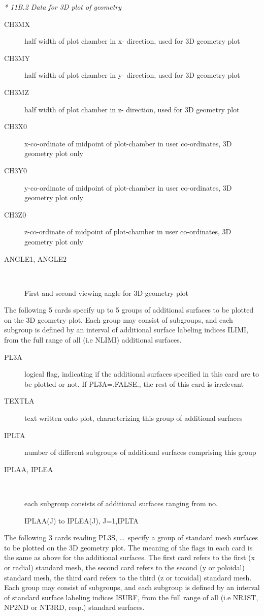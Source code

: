 \textsl{* 11B.2 Data for 3D plot of geometry}

\begin{description}
  \item[CH3MX] half width of plot chamber in x- direction, used for 3D geometry
        plot
  \item[CH3MY] half width of plot chamber in y- direction, used for 3D
        geometry plot
  \item[CH3MZ] half width of plot chamber in z- direction, used for
        3D geometry plot
  \item[CH3X0] x-co-ordinate of midpoint of plot-chamber in user
        co-ordinates, 3D geometry plot only
  \item[CH3Y0] y-co-ordinate of midpoint of
        plot-chamber in user co-ordinates, 3D geometry plot only
  \item[CH3Z0]
        z-co-ordinate of midpoint of plot-chamber in user co-ordinates, 3D geometry
        plot only
  \item[ANGLE1, ANGLE2] ~ 

        First and second viewing angle for 3D geometry plot
\end{description}

The following 5 cards specify up to 5 groups of additional surfaces to be
plotted on the 3D geometry plot.
Each group may consist of subgroups, and each subgroup is defined by an
interval of additional surface labeling indices ILIMI, from the full range of
all (i.e NLIMI) additional surfaces.

\begin{description}
  \item[PL3A] logical flag, indicating if the additional surfaces specified in
        this card are to be plotted or not.
        If PL3A=.FALSE., the rest of this card is irrelevant
  \item[TEXTLA] text written
        onto plot, characterizing this group of additional surfaces
  \item[IPLTA] number
        of different subgroups of additional surfaces comprising this group
  \item[IPLAA, IPLEA] ~ 

        each \hfill subgroup \hfill consists \hfill of \hfill additional \hfill
        surfaces \hfill ranging \hfill from \hfill no.

        IPLAA(J) to IPLEA(J), J=1,IPLTA
\end{description}

The following 3 cards reading PL3S, \dots\ specify a group of standard mesh
surfaces to be plotted on the 3D geometry plot.
The meaning of the flags in each card is the same as above for the additional
surfaces.
The first card refers to the first (x or radial) standard mesh, the second card
refers to the second (y or poloidal) standard mesh, the third card refers to
the third (z or toroidal) standard mesh.
Each group may consist of subgroups, and each subgroup is defined by an
interval of standard surface labeling indices ISURF, from the full range of all
(i.e NR1ST, NP2ND or NT3RD, resp.) standard surfaces.


